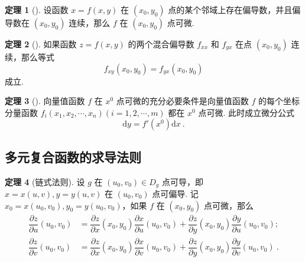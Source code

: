 \documentclass[zihao=-4,linespread=1.8,UTF8,nothm]{aytony_base}
\theoremstyle{definition}
\newtheorem{theorem}{\indent\heiti\textbf{定理}}[subsection]
\begin{document}
\begin{theorem}[]
    设函数 $x = f(x, y)$ 在 $(x_0, y_0)$ 点的某个邻域上存在偏导数，并且偏导数在 $(x_0, y_0)$ 连续，那么 $f$ 在 $(x_0, y_0)$ 点可微.
\end{theorem}

\begin{theorem}[]
    如果函数 $z = f(x, y)$ 的两个混合偏导数 $f_{xx}$ 和 $f_{yx}$ 在点 $(x_0, y_0)$ 连续，那么等式 $$
        f_{xy}(x_0, y_0) = f_{yx}(x_0, y_0)
    $$ 成立.
\end{theorem}

\begin{theorem}[]
    向量值函数 $f$ 在 $x^0$ 点可微的充分必要条件是向量值函数 $f$ 的每个坐标分量函数 $f_i({x}_1, {x}_2, \cdots, {x}_{n}) (i = 1, 2, \cdots, m)$ 都在 $x^0$ 点可微. 此时成立微分公式 $$
        \mathrm{d}y = f'(x^0)\mathrm{d}x\ .
    $$
\end{theorem}

\subsection{多元复合函数的求导法则}

\begin{theorem}[链式法则]
    设 $g$ 在 $(u_0, v_0) \in D_g$ 点可导，即 $x = x(u, v), y = y(u, v)$ 在 $(u_0, v_0)$ 点可偏导. 记 $x_0 = x(u_0, v_0), y_0 = y(u_0, v_0)$，如果 $f$ 在 $(x_0, y_0)$ 点可微，那么 $$
        \begin{aligned}
            \dfrac{\partial z}{\partial u}(u_0, v_0) & = \dfrac{\partial z}{\partial x}(x_0, y_0)\dfrac{\partial x}{\partial u}(u_0, v_0) + \dfrac{\partial z}{\partial y}(x_0, y_0)\dfrac{\partial y}{\partial u}(u_0, v_0);   \\
            \dfrac{\partial z}{\partial v}(u_0, v_0) & = \dfrac{\partial z}{\partial x}(x_0, y_0)\dfrac{\partial x}{\partial v}(u_0, v_0) + \dfrac{\partial z}{\partial y}(x_0, y_0)\dfrac{\partial y}{\partial v}(u_0, v_0)\ .
        \end{aligned}
    $$
\end{theorem}
\end{document}
